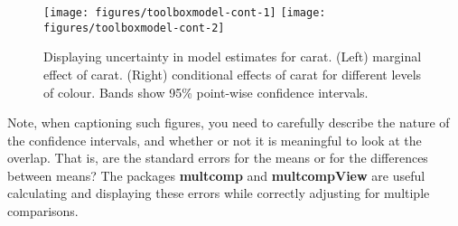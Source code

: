 \begin{Shaded}
\end{Shaded}

\begin{figure}
\texttt{[image: figures/toolboxmodel-cont-1]} \texttt{[image: figures/toolboxmodel-cont-2]} \caption{Displaying uncertainty in model estimates for carat. (Left) marginal effect of carat. (Right) conditional effects of carat for different levels of colour. Bands show 95\% point-wise confidence intervals.\label{fig:model-cont}}
\end{figure}

Note, when captioning such figures, you need to carefully describe the
nature of the confidence intervals, and whether or not it is meaningful
to look at the overlap. That is, are the standard errors for the means
or for the differences between means? The packages \textbf{multcomp} and
\textbf{multcompView} are useful calculating and displaying these errors
while correctly adjusting for multiple comparisons.
 


